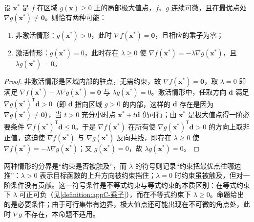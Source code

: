 \documentclass[../main.tex]{subfiles}
\begin{document}
\begin{proposition}[不等式约束下驻点的两种情形]\label{proposition:appC-不等式驻点条件}
设 $\bm{x}^{*}$ 是 $f$ 在区域 $g(\bm{x})\geqslant0$ 上的局部极大值点，$f$、$g$ 连续可微，且在最优点处 $\nabla g(\bm{x}^{*})\neq\bm{0}$。则恰有两种可能：
\begin{enumerate}
  \item 非激活情形：$g(\bm{x}^{*})>0$，此时 $\nabla f(\bm{x}^{*})=\bm{0}$，且相应的乘子为零；
  \item 激活情形：$g(\bm{x}^{*})=0$，此时存在 $\lambda\geqslant0$ 使 $\nabla f(\bm{x}^{*})=-\lambda\nabla g(\bm{x}^{*})$，且 $\lambda g(\bm{x}^{*})=0$。
\end{enumerate}
\end{proposition}

\begin{proof}
非激活情形是区域内部的驻点，无需约束，故 $\nabla f(\bm{x}^{*})=\bm{0}$，取 $\lambda=0$ 即满足 $\nabla f(\bm{x}^{*})+\lambda\nabla g(\bm{x}^{*})=\bm{0}$ 与 $\lambda g(\bm{x}^{*})=0$。激活情形中，任取方向 $\bm{d}$ 满足 $\nabla g(\bm{x}^{*})^{\mathsf{T}}\bm{d}>0$（即 $\bm{d}$ 指向区域 $g>0$ 的内部，这样的 $\bm{d}$ 存在是因为 $\nabla g(\bm{x}^{*})\neq\bm{0}$），当 $t>0$ 充分小时点 $\bm{x}^{*}+t\bm{d}$ 仍可行；由 $\bm{x}^{*}$ 是极大值点得一阶必要条件 $\nabla f(\bm{x}^{*})^{\mathsf{T}}\bm{d}\leqslant0$。于是 $\nabla f(\bm{x}^{*})$ 在所有使 $\nabla g(\bm{x}^{*})^{\mathsf{T}}\bm{d}>0$ 的方向上取非正值，这迫使 $\nabla f(\bm{x}^{*})$ 与 $\nabla g(\bm{x}^{*})$ 反向共线，即存在 $\lambda\geqslant0$ 使 $\nabla f(\bm{x}^{*})=-\lambda\nabla g(\bm{x}^{*})$；又 $g(\bm{x}^{*})=0$，故 $\lambda g(\bm{x}^{*})=0$。
\end{proof}

\begin{remark}
两种情形的分界是“约束是否被触及”，而 $\lambda$ 的符号则记录“约束把最优点往哪边推”：$\lambda>0$ 表示目标函数的上升方向被约束挡住；$\lambda=0$ 时约束虽被触及，但对一阶条件没有贡献。这一符号条件是不等式约束与等式约束的本质区别：在等式约束下 $\lambda$ 可正可负（见\cref{definition:appC-乘子}），而在不等式约束下 $\lambda\geqslant0$。命题给出的是必要条件；由于可行集带有边界，极大值点还可能出现在不可微的角点处，此时 $\nabla g$ 不存在，本命题不适用。
\end{remark}
\end{document}

